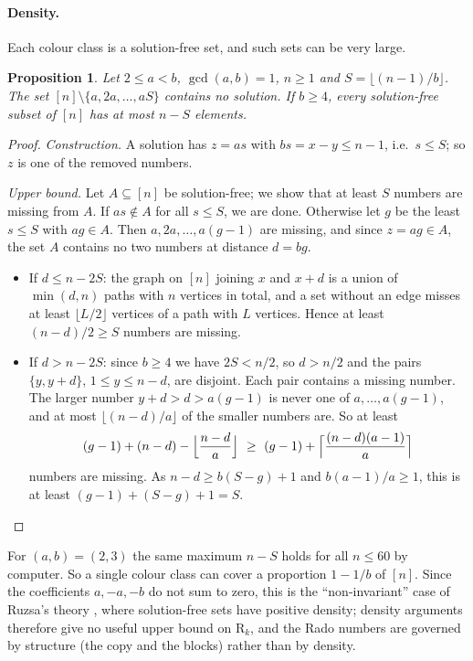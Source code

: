 \documentclass[11pt,a4paper]{article}
\newtheorem{proposition}[theorem]{Proposition}
\theoremstyle{definition}
\theoremstyle{remark}
\newcommand{\R}{\mathrm{R}}
\begin{document}
\paragraph{Density.} Each colour class is a solution-free set, and such sets can be very large.
\begin{proposition}\label{prop:density}
Let $2\le a<b$, $\gcd(a,b)=1$, $n\ge1$ and $S=\lfloor(n-1)/b\rfloor$. The set $[n]\setminus\{a,2a,\dots,aS\}$ contains no solution. If $b\ge4$, every solution-free subset of $[n]$ has at most $n-S$ elements.
\end{proposition}
\begin{proof}
\emph{Construction.} A solution has $z=as$ with $bs=x-y\le n-1$, i.e.\ $s\le S$; so $z$ is one of the removed numbers.

\emph{Upper bound.} Let $A\subseteq[n]$ be solution-free; we show that at least $S$ numbers are missing from $A$. If $as\notin A$ for all $s\le S$, we are done. Otherwise let $g$ be the least $s\le S$ with $ag\in A$. Then $a,2a,\dots,a(g-1)$ are missing, and since $z=ag\in A$, the set $A$ contains no two numbers at distance $d=bg$.
\begin{itemize}
\item If $d\le n-2S$: the graph on $[n]$ joining $x$ and $x+d$ is a union of $\min(d,n)$ paths with $n$ vertices in total, and a set without an edge misses at least $\lfloor L/2\rfloor$ vertices of a path with $L$ vertices. Hence at least $(n-d)/2\ge S$ numbers are missing.
\item If $d>n-2S$: since $b\ge4$ we have $2S<n/2$, so $d>n/2$ and the pairs $\{y,y+d\}$, $1\le y\le n-d$, are disjoint. Each pair contains a missing number. The larger number $y+d>d>a(g-1)$ is never one of $a,\dots,a(g-1)$, and at most $\lfloor(n-d)/a\rfloor$ of the smaller numbers are. So at least
\[
  (g-1)+(n-d)-\Bigl\lfloor\frac{n-d}{a}\Bigr\rfloor\ \ge\ (g-1)+\Bigl\lceil\frac{(n-d)(a-1)}{a}\Bigr\rceil
\]
numbers are missing. As $n-d\ge b(S-g)+1$ and $b(a-1)/a\ge1$, this is at least $(g-1)+(S-g)+1=S$. \qedhere
\end{itemize}
\end{proof}
For $(a,b)=(2,3)$ the same maximum $n-S$ holds for all $n\le60$ by computer. So a single colour class can cover a proportion $1-1/b$ of $[n]$. Since the coefficients $a,-a,-b$ do not sum to zero, this is the ``non-invariant'' case of Ruzsa's theory \cite{Ruz93}, where solution-free sets have positive density; density arguments therefore give no useful upper bound on $\R_k$, and the Rado numbers are governed by structure (the copy and the blocks) rather than by density.
\end{document}

